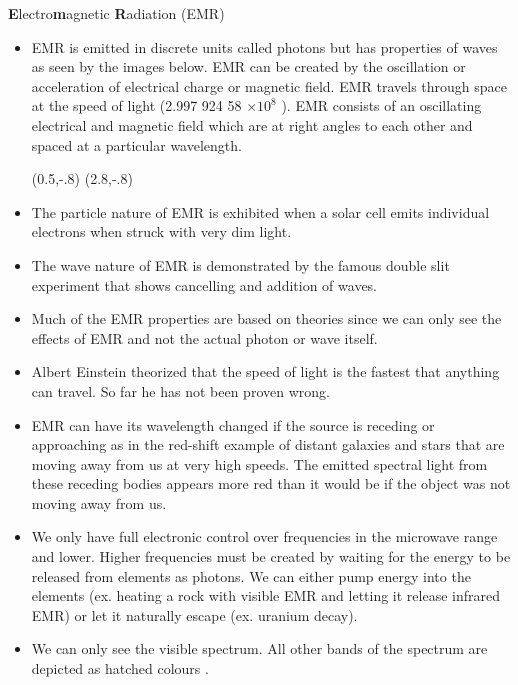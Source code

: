 {\Large {\bfseries E}lectro{\bfseries m}agnetic {\bfseries R}adiation (EMR)}
\begin{itemize}
\item EMR is emitted in discrete units called photons but has properties of waves as seen by the images below. EMR can be created by the oscillation or acceleration of electrical charge or magnetic field. EMR travels through space at the speed of light (2.997 924 58 $\times 10^{8}$ \metrepersecond ). EMR consists of an oscillating electrical and magnetic field which are at right angles to each other and spaced at a particular wavelength.

(0.5,-.8){}
(2.8,-.8){}

\vspace{2.2in}

\item The particle nature of EMR is exhibited when a solar cell emits individual electrons when struck with very dim light.

\item The wave nature of EMR is demonstrated by the famous double slit experiment that shows cancelling and addition of waves.

\item Much of the EMR properties are based on theories since we can only see the effects of EMR and not the actual photon or wave itself.

\item Albert Einstein theorized that the speed of light is the fastest that anything can travel. So far he has not been proven wrong.

\item EMR can have its wavelength changed if the source is receding or approaching as in the red-shift example of distant galaxies and stars that are moving away from us at very high speeds. The emitted spectral light from these receding bodies appears more red than it would be if the object was not moving away from us.

\item We only have full electronic control over frequencies in the microwave range and lower. Higher frequencies must be created by waiting for the energy to be released from elements as photons. We can either pump energy into the elements (ex. heating a rock with visible EMR and letting it release infrared EMR) or let it naturally escape (ex. uranium decay).

\item We can only see the visible spectrum. All other bands of the spectrum are depicted as hatched colours \hspace{0.4in}.


\end{itemize}
